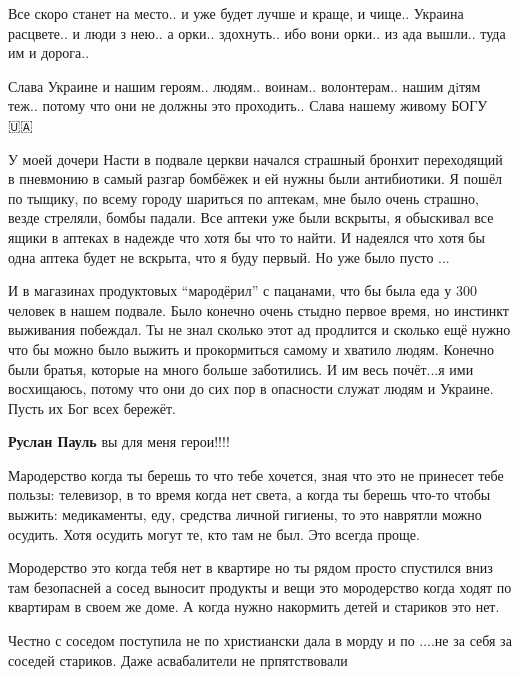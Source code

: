 Все скоро станет на место.. и уже будет лучше и краще, и чище.. Украина
расцвете.. и люди з нею.. а орки.. здохнуть.. ибо вони орки.. из ада вышли.. туда им
и дорога..

Слава Украине и нашим героям.. людям.. воинам.. волонтерам.. нашим дiтям
теж.. потому что они не должны это проходить.. Слава нашему живому БОГУ
🇺🇦


У моей дочери Насти в подвале церкви начался страшный бронхит переходящий в
пневмонию в самый разгар бомбёжек и ей нужны были антибиотики. Я пошёл по
тыщику, по всему городу шариться по аптекам, мне было очень страшно, везде
стреляли, бомбы падали. Все аптеки уже были вскрыты, я обыскивал все ящики в
аптеках в надежде что хотя бы что то найти. И надеялся что хотя бы одна аптека
будет не вскрыта, что я буду первый. Но уже было пусто ...

И в магазинах продуктовых \enquote{мародёрил} с пацанами, что бы была еда у 300
человек в нашем подвале. Было конечно очень стыдно первое время, но инстинкт
выживания побеждал. Ты не знал сколько этот ад продлится и сколько ещё нужно
что бы можно было выжить и прокормиться самому и хватило людям. Конечно были
братья, которые на много больше заботились. И им весь почёт...я ими восхищаюсь,
потому что они до сих пор в опасности служат людям и Украине. Пусть их Бог всех
бережёт.

\begin{itemize} %
\textbf{Руслан Пауль} вы для меня герои!!!!
\end{itemize} %


Мародерство когда ты берешь то что тебе хочется, зная что это не принесет тебе
пользы: телевизор, в то время когда нет света, а когда ты берешь что-то чтобы
выжить: медикаменты, еду, средства личной гигиены, то это наврятли можно
осудить. Хотя осудить могут те, кто там не был. Это всегда проще.


Мородерство это когда тебя нет в квартире но ты рядом просто спустился вниз там
безопасней а сосед выносит продукты и вещи это мородерство когда ходят по
квартирам в своем же доме. А когда нужно накормить детей и стариков это нет.

Честно с соседом поступила не по христиански дала в морду и по ....не за себя
за соседей стариков. Даже асвабалители не прпятствовали
